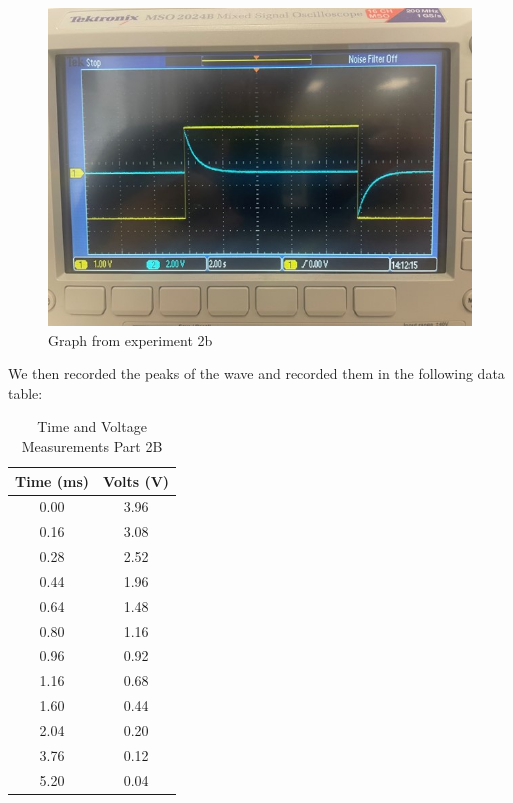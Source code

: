 \documentclass[11pt]{article}
\begin{document}
    \begin{figure}
        \centering
        \includegraphics[width=1.0\linewidth]{resources/images/rlc part 2b graph}
        \caption{Graph from experiment 2b}
    \end{figure}

    We then recorded the peaks of the wave and recorded them in the following data table:

    \begin{table}[h]
        \centering
        \caption{Time and Voltage Measurements Part 2B}
        \begin{tabular}{cc}
            \toprule
            \textbf{Time (ms)} & \textbf{Volts (V)} \\
            \midrule
            0.00 & 3.96 \\
            0.16 & 3.08 \\
            0.28 & 2.52 \\
            0.44 & 1.96 \\
            0.64 & 1.48 \\
            0.80 & 1.16 \\
            0.96 & 0.92 \\
            1.16 & 0.68 \\
            1.60 & 0.44 \\
            2.04 & 0.20 \\
            3.76 & 0.12 \\
            5.20 & 0.04 \\
            \bottomrule
        \end{tabular}
    \end{table}
\end{document}
